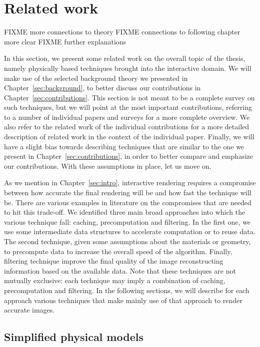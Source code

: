 \chapter{Related work}
FIXME more connections to theory
FIXME connections to following chapter more clear
FIXME further explanations

\label{sec:related}

In this section, we present some related work on the overall topic of the thesis, namely physically based techniques brought into the interactive domain. We will make use of the selected background theory we presented in Chapter~\ref{sec:background}, to better discuss our contributions in Chapter~\ref{sec:contributions}. This section is not meant to be a complete survey on such techniques, but we will point at the most important contributions, referring to a number of individual papers and surveys for a more complete overview. We also refer to the related work of the individual contributions for a more detailed description of related work in the context of the individual paper. Finally, we will have a slight bias towards describing techniques that are similar to the one we present in Chapter~\ref{sec:contributions}, in order to better compare and emphasize our contributions.
With these assumptions in place, let us move on. 

As we mention in Chapter~\ref{sec:intro}, interactive rendering requires a compromise between how accurate the final rendering will be and how fast the technique will be. There are various examples in literature on the compromises that are needed to hit this trade-off. We identified three main broad approaches into which the various technique fall: caching, precomputation and filtering. In the first one, we use some intermediate data structures to accelerate computation or to reuse data. The second technique, given some assumptions about the materials or geometry, to precompute data to increase the overall speed of the algorithm. Finally, filtering technique improve the final quality of the image reconstructing information based on the available data. Note that these techniques are not mutually exclusive: each technique may imply a combination of caching, precomputation and filtering. In the following sections, we will describe for each approach various techniques that make mainly use of that approach to render accurate images. 

\section{Simplified physical models}

